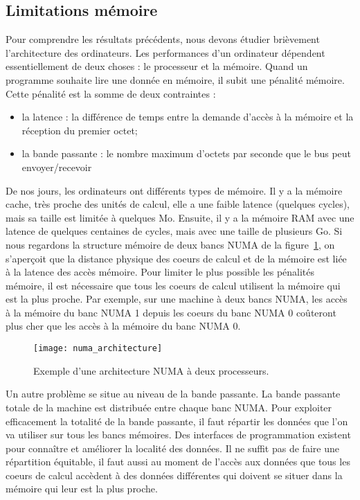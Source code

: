 \subsection{Limitations mémoire}
Pour comprendre les résultats précédents, nous devons étudier brièvement l'architecture des ordinateurs.
%
Les performances d'un ordinateur dépendent essentiellement de deux choses : le processeur et la mémoire.
%
Quand un programme souhaite lire une donnée en mémoire, il subit une pénalité mémoire.
%
Cette pénalité est la somme de deux contraintes :
\begin{itemize}
        \item la latence : la différence de temps entre la demande d'accès à la mémoire et la réception du premier octet;
        \item la bande passante : le nombre maximum d'octets par seconde que le bus peut envoyer/recevoir
\end{itemize}
%
De nos jours, les ordinateurs ont différents types de mémoire.
%
Il y a la mémoire cache, très proche des unités de calcul, elle a une faible latence (quelques cycles), mais sa taille est limitée à quelques Mo.
%
Ensuite, il y a la mémoire RAM avec une latence de quelques centaines de cycles, mais avec une taille de plusieurs Go.
%
Si nous regardons la structure mémoire de deux bancs NUMA de la figure~\ref{fig:numa_architecture}, on s'aperçoit que la distance physique des coeurs de calcul et de la mémoire est liée à la latence des accès mémoire.
%
Pour limiter le plus possible les pénalités mémoire, il est nécessaire que tous les coeurs de calcul utilisent la mémoire qui est la plus proche.
%
Par exemple, sur une machine à deux bancs NUMA, les accès à la mémoire du banc NUMA 1 depuis les coeurs du banc NUMA 0 coûteront plus cher que les accès à la mémoire du banc NUMA 0.
\begin{figure}
  \centering
  \texttt{[image: numa\_architecture]}
  \caption{Exemple d'une architecture NUMA à deux processeurs.}
  \label{fig:numa_architecture}
\end{figure}
Un autre problème se situe au niveau de la bande passante.
%
La bande passante totale de la machine est distribuée entre chaque banc NUMA.
%
Pour exploiter efficacement la totalité de la bande passante, il faut répartir les données que l'on va utiliser sur tous les bancs mémoires.
%
Des interfaces de programmation existent pour connaître et améliorer la localité des données.
%
Il ne suffit pas de faire une répartition équitable, il faut aussi au moment de l'accès aux données que tous les coeurs de calcul accèdent à des données différentes qui doivent se situer dans la mémoire qui leur est la plus proche.
